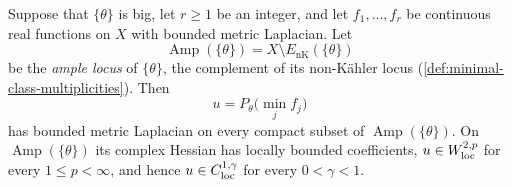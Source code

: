 \begin{theorem}\label{thm:big-metric-laplacian-rooftop}
Suppose that $\{\theta\}$ is big, let $r\geq1$ be an integer, and let $f_1,\ldots,f_r$ be continuous real functions on $X$ with bounded metric Laplacian. Let
\[
 \operatorname{Amp}(\{\theta\})=X\setminus E_{\mathrm{nK}}(\{\theta\})
\]
be the \emph{ample locus} of $\{\theta\}$, the complement of its non-K\"ahler locus (\cref{def:minimal-class-multiplicities}). Then
\[
 u=P_\theta\bigl(\min_j f_j\bigr)
\]
has bounded metric Laplacian on every compact subset of $\operatorname{Amp}(\{\theta\})$. On $\operatorname{Amp}(\{\theta\})$ its complex Hessian has locally bounded coefficients, $u\in W^{2,p}_{\mathrm{loc}}$ for every $1\leq p<\infty$, and hence $u\in C^{1,\gamma}_{\mathrm{loc}}$ for every $0<\gamma<1$.
\end{theorem}
